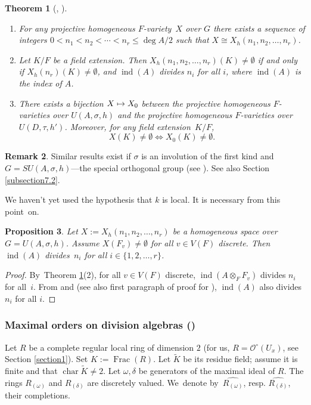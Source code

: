 \documentclass[JEP,XML,SOM,Unicode,NoFloatCountersInSection,published]{cedram}
\newcommand{\mto}{\mathchoice{\longmapsto}{\mapsto}{\mapsto}{\mapsto}}
\DeclareMathOperator{\Char}{char}
\DeclareMathOperator{\Frac}{Frac}
\DeclareMathOperator{\ind}{ind}
\newtheorem{thm}{Theorem}[section]
\newtheorem{prop}[thm]{Proposition}
\theoremstyle{definition}
\newtheorem{rem}[thm]{Remark}
\begin{document}
\skpt
\begin{thm}[{\cite[\S 2]{wu}, \cite[Th.\,12.1]{parsur}}] \label{7.3}
\begin{enumerate}
\item
For any projective homogeneous $F$-variety~$X$ over $G$ there exists a sequence of integers $0< n_1 < n_2 < \cdots < n_r \leqslant \deg{A}/2$ such that $X \cong X_h(n_1, n_2, \dots, n_r)$.

\item
Let $K/F$ be a field extension. Then $X_h(n_1, n_2, \dots, n_r)(K) \neq \emptyset$ if and only if $X_h(n_r)(K) \neq \emptyset$, and $\ind(A)$ divides $n_i$ for all $i$, where $\ind(A)$ is the index of $A$.

\item
There exists a bijection $X \mto X_0$ between the projective homogeneous $F$\nobreakdash-va\-ri\-eties over $\textit{U}(A, \sigma, h)$ and the projective homogeneous $F$-varieties over $\textit{U}(D, \tau, h')$. Moreover, for any field extension~$K/F$,
\[
X(K) \neq \emptyset \iff X_0(K) \neq \emptyset.
\]
\end{enumerate}
\end{thm}

\begin{rem} \label{7.3.1} Similar results exist if $\sigma$ is an involution of the first kind and $G=\textit{SU}(A, \sigma, h)$---the special orthogonal group (see \cite[\S 2]{wu}). See also Section \ref{subsection7.2}.
\end{rem}

We haven't yet used the hypothesis that $k$ is local. It is necessary from this point~on.

\begin{prop}\label{7.4} Let $X:=X_h(n_1, n_2, \dots, n_r)$ be a homogeneous space over ${G=U(A, \sigma, h)}$.
Assume ${X(F_v) \neq \emptyset}$ for all $v \in V(F)$ discrete. Then $\ind(A)$ divi\-des~$n_i$ for all $i \in \{1, 2, \dots, r\}$.
\end{prop}

\begin{proof}
By~Theorem \ref{7.3}(2), for all $v \in V(F)$ discrete, $\ind(A \otimes_F F_v)$ divides $n_i$ for all~$i$. From \cite[Th.\,5.5]{hhk} and \cite[Prop.\,5.10]{parsurpreeti} (see also first paragraph of proof for \cite[Th.\,12.2]{parsur}), $\ind(A)$ also divides $n_i$ for all $i$.
\end{proof}

\subsubsection{Maximal orders on division algebras (\cf \cite[\S 10]{parsur})}
Let $R$ be a complete regular local ring of dimension $2$ (for us, $R=\mathcal{O}^{\circ}(U_x)$, see Section \ref{section1}). Set $K:=\Frac(R)$. Let $\widetilde{K}$ be its residue field; assume it is finite and that $\Char \widetilde{K} \neq 2$.
Let $\omega, \delta$ be generators of the maximal ideal of $R$. The rings $R_{(\omega)}$ and $R_{(\delta)}$ are discretely valued. We~denote by~$\widehat{R_{(\omega)}}$, resp. $\widehat{R_{(\delta)}}$, their completions.
\end{document}
